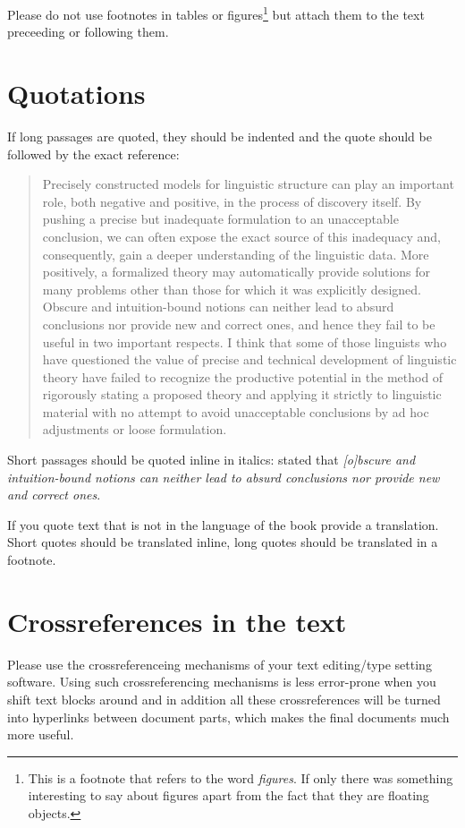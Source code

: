 Please do not use footnotes in tables or figures\footnote{
  This is a footnote that refers to the word \emph{figures}. If only there was something interesting
  to say about figures apart from the fact that they are floating objects.
} but attach them to the text preceeding or following them.


\section{Quotations}

If long passages are quoted, they should be indented and the quote should be followed by the exact reference:
\begin{quotation}
Precisely constructed models for linguistic structure can play an
important role, both negative and positive, in the process of discovery 
itself. By pushing a precise but inadequate formulation to
an unacceptable conclusion, we can often expose the exact source
of this inadequacy and, consequently, gain a deeper understanding
of the linguistic data. More positively, a formalized theory may 
automatically provide solutions for many problems other than those
for which it was explicitly designed. Obscure and intuition-bound
notions can neither lead to absurd conclusions nor provide new and
correct ones, and hence they fail to be useful in two important respects. 
I think that some of those linguists who have questioned
the value of precise and technical development of linguistic theory
have failed to recognize the productive potential in the method
of rigorously stating a proposed theory and applying it strictly to
linguistic material with no attempt to avoid unacceptable conclusions 
by ad hoc adjustments or loose formulation.
\citep[5]{Chomsky57a}
\end{quotation}
%
Short passages should be quoted inline in italics: \citet[5]{Chomsky57a} stated that \emph{[o]bscure
  and intuition-bound notions can neither lead to absurd conclusions nor provide new and
correct ones}.

If you quote text that is not in the language of the book provide a translation. Short quotes should
be translated inline, long quotes should be translated in a footnote.

\section{Crossreferences in the text}

Please use the crossreferenceing mechanisms of your text editing/type setting software. Using such
crossreferencing mechanisms is less error-prone when you shift text blocks around and in addition
all these crossreferences will be turned into hyperlinks between document parts, which makes the
final documents much more useful.

